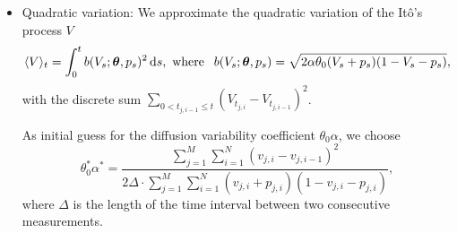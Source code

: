 \documentclass[11pt]{article}
\theoremstyle{definition}
\begin{document}
\begin{itemize}
\item {Quadratic variation:} We approximate the quadratic variation of the  It\^{o}'s  process $V$
\begin{equation*}
\langle V\rangle _t=\int_0^t b(V_s; \bm{\theta}, p_s)^2 \dif s, \text{ where }  \:\: b(V_s; \bm{\theta}, p_s) = 
\sqrt{2 \alpha \theta_0 (V_s +p_s ) (1-V_s - p_s)},
\end{equation*}
with the discrete sum $\sum_{0< t_{j, i-1} \leq t}\left(V_{t_{j, i}} - V_{t_{j, i-1}}\right)^2$.

As initial guess for the diffusion variability coefficient $\theta_0 \alpha$, we choose
\begin{equation}
\theta_0^*\alpha^*=\frac{\sum_{j=1}^M\sum_{i=1}^N(v_{j,i} - v_{j,i-1})^2}{2\Delta\cdot\sum_{j=1}^M\sum_{i=1}^N(v_{j,i}+p_{j,i})(1-v_{j,i}-p_{j,i})},
\label{Eq-2}
\end{equation}
where $\Delta$ is the length of the time interval between two consecutive measurements.
\end{itemize}

%
\end{document}
